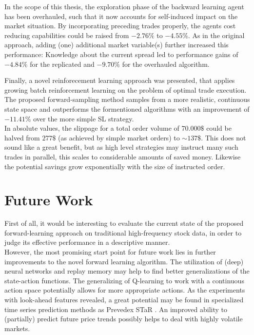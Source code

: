 In the scope of this thesis, the exploration phase of the backward learning agent has been overhauled, such that it now accounts for self-induced impact on the market situation. By incorporating preceding trades properly, the agents cost reducing capabilities could be raised from $-2.76\%$ to $-4.55\%$. As in the original approach, adding (one) additional market variable(s) further increased this performance: Knowledge about the current spread led to performance gains of $-4.84\%$ for the replicated and $-9.70\%$ for the overhauled algorithm.

Finally, a novel reinforecement learning approach was presented, that applies growing batch reinforcement learning on the problem of optimal trade execution. The proposed forward-sampling method samples from a more realistic, continuous state space and outperforms the formentioned algorithms with an improvement of $-11.41\%$ over the more simple \ac{SL} strategy.\\

In absolute values, the slippage for a total order volume of $70.000\$$ could be halved from $277\$$ (as achieved by simple market orders) to $\sim137\$$. This does not sound like a great benefit, but as high level strategies may instruct many such trades in parallel, this scales to considerable amounts of saved money. Likewise the potential savings grow exponentially with the size of instructed order.





\section{Future Work}
First of all, it would be interesting to evaluate the current state of the proposed forward-learning approach on traditional high-frequency stock data, in order to judge its effective performance in a descriptive manner.\\

However, the most promising start point for future work lies in further improvements to the novel forward learning algorithm. The utilization of (deep) neural networks and replay memory may help to find better generalizations of the state-action functions. The generalizing of Q-learning to work with a continuous action space potentially allows for more appropriate actions. As the experiments with look-ahead features revealed, a great potential may be found in specialized time series prediction methods as \eg Prevedex STaR \Cite{STAR}. An improved ability to (partially) predict future price trends possibly helps to deal with highly volatile markets.

